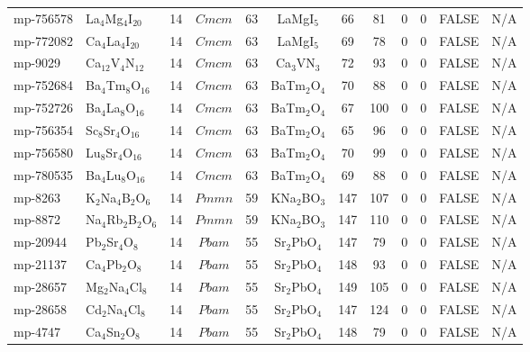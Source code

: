 {\begin{longtable}{llcccccccccc}
    mp-756578 & La$_{4}$Mg$_{4}$I$_{20}$ & 14    & $Cmcm$ & 63    & LaMgI$_{5}$ & 66    & 81    & 0     & 0     & FALSE & N/A \\
    mp-772082 & Ca$_{4}$La$_{4}$I$_{20}$ & 14    & $Cmcm$ & 63    & LaMgI$_{5}$ & 69    & 78    & 0     & 0     & FALSE & N/A \\
    mp-9029 & Ca$_{12}$V$_{4}$N$_{12}$ & 14    & $Cmcm$ & 63    & Ca$_{3}$VN$_{3}$ & 72    & 93    & 0     & 0     & FALSE & N/A \\
    mp-752684 & Ba$_{4}$Tm$_{8}$O$_{16}$ & 14    & $Cmcm$ & 63    & BaTm$_{2}$O$_{4}$ & 70    & 88    & 0     & 0     & FALSE & N/A \\
    mp-752726 & Ba$_{4}$La$_{8}$O$_{16}$ & 14    & $Cmcm$ & 63    & BaTm$_{2}$O$_{4}$ & 67    & 100   & 0     & 0     & FALSE & N/A \\
    mp-756354 & Sc$_{8}$Sr$_{4}$O$_{16}$ & 14    & $Cmcm$ & 63    & BaTm$_{2}$O$_{4}$ & 65    & 96    & 0     & 0     & FALSE & N/A \\
    mp-756580 & Lu$_{8}$Sr$_{4}$O$_{16}$ & 14    & $Cmcm$ & 63    & BaTm$_{2}$O$_{4}$ & 70    & 99    & 0     & 0     & FALSE & N/A \\
    mp-780535 & Ba$_{4}$Lu$_{8}$O$_{16}$ & 14    & $Cmcm$ & 63    & BaTm$_{2}$O$_{4}$ & 69    & 88    & 0     & 0     & FALSE & N/A \\
    mp-8263 & K$_{2}$Na$_{4}$B$_{2}$O$_{6}$ & 14    & $Pmmn$ & 59    & KNa$_{2}$BO$_{3}$ & 147   & 107   & 0     & 0     & FALSE & N/A \\
    mp-8872 & Na$_{4}$Rb$_{2}$B$_{2}$O$_{6}$ & 14    & $Pmmn$ & 59    & KNa$_{2}$BO$_{3}$ & 147   & 110   & 0     & 0     & FALSE & N/A \\
    mp-20944 & Pb$_{2}$Sr$_{4}$O$_{8}$ & 14    & $Pbam$ & 55    & Sr$_{2}$PbO$_{4}$ & 147   & 79    & 0     & 0     & FALSE & N/A \\
    mp-21137 & Ca$_{4}$Pb$_{2}$O$_{8}$ & 14    & $Pbam$ & 55    & Sr$_{2}$PbO$_{4}$ & 148   & 93    & 0     & 0     & FALSE & N/A \\
    mp-28657 & Mg$_{2}$Na$_{4}$Cl$_{8}$ & 14    & $Pbam$ & 55    & Sr$_{2}$PbO$_{4}$ & 149   & 105   & 0     & 0     & FALSE & N/A \\
    mp-28658 & Cd$_{2}$Na$_{4}$Cl$_{8}$ & 14    & $Pbam$ & 55    & Sr$_{2}$PbO$_{4}$ & 147   & 124   & 0     & 0     & FALSE & N/A \\
    mp-4747 & Ca$_{4}$Sn$_{2}$O$_{8}$ & 14    & $Pbam$ & 55    & Sr$_{2}$PbO$_{4}$ & 148   & 79    & 0     & 0     & FALSE & N/A \\

\end{longtable}}
